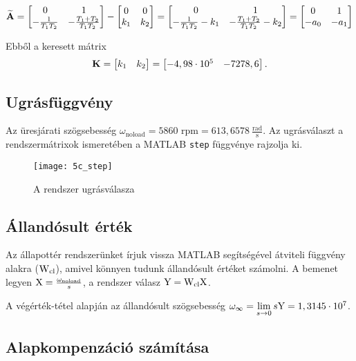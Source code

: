 \begin{equation}
	\widetilde{\boldsymbol{\mathrm{A}}} = \begin{bmatrix}0&1\\-\frac{1}{T_1T_2}&-\frac{T_1+T_2}{T_1T_2}\end{bmatrix} - 
	\begin{bmatrix}0&0\\k_1&k_2\end{bmatrix} = \begin{bmatrix}0&1\\-\frac{1}{T_1T_2}-k_1&-\frac{T_1+T_2}{T_1T_2}-k_2\end{bmatrix} = 
	\begin{bmatrix}0&1\\ -a_0& -a_1\end{bmatrix}
\end{equation}

Ebből a keresett mátrix
\begin{equation}
	\boldsymbol{\mathrm{K}} = \begin{bmatrix}k_1&k_2\end{bmatrix} = \begin{bmatrix}-4,98\cdot10^5& -7278,6\end{bmatrix}.
\end{equation}


\subsection{Ugrásfüggvény}

Az üresjárati szögsebesség $\omega_\text{noload} = 5860\text{ rpm} = 613,6578~\frac{\text{rad}}{\text{s}}$. Az ugrásválaszt a rendszermátrixok ismeretében a MATLAB \verb|step| függvénye rajzolja ki.

\begin{figure}[H]
	\centering
	\texttt{[image: 5c\_step]}
	\caption{A rendszer ugrásválasza}
	\label{fig:5c_step}
\end{figure}



\subsection{Állandósult érték}\label{subsec:5d}

Az állapottér rendszerünket írjuk vissza MATLAB segítségével átviteli függvény
alakra ($\mathrm{W}_\text{cl}$), amivel könnyen tudunk állandósult értéket számolni.
A bemenet legyen $\mathrm{X} = \frac{\omega_\text{noload}}{s}$, a rendszer válasz $\mathrm{Y} = \mathrm{W}_\text{cl}\mathrm{X}$.

A végérték-tétel alapján az állandósult szögsebesség $\omega_\infty = \lim\limits_{s\rightarrow 0}s\mathrm{Y} = 1,3145\cdot10^7$.%


\subsection{Alapkompenzáció számítása}

